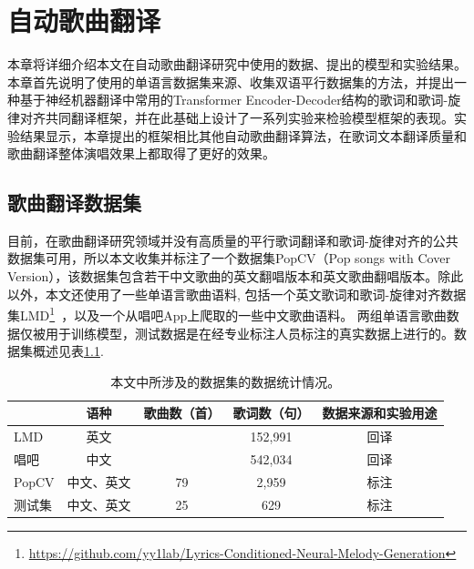 \newcommand{\modelname}{LTAG}
\chapter{自动歌曲翻译}
本章将详细介绍本文在自动歌曲翻译研究中使用的数据、提出的模型和实验结果。本章首先说明了使用的单语言数据集来源、收集双语平行数据集的方法，并提出一种基于神经机器翻译中常用的Transformer Encoder-Decoder结构的歌词和歌词-旋律对齐共同翻译框架，并在此基础上设计了一系列实验来检验模型框架的表现。实验结果显示，本章提出的框架相比其他自动歌曲翻译算法，在歌词文本翻译质量和歌曲翻译整体演唱效果上都取得了更好的效果。
\section{歌曲翻译数据集}
目前，在歌曲翻译研究领域并没有高质量的平行歌词翻译和歌词-旋律对齐的公共数据集可用，所以本文收集并标注了一个数据集PopCV（Pop songs with Cover Version），该数据集包含若干中文歌曲的英文翻唱版本和英文歌曲翻唱版本。除此以外，本文还使用了一些单语言歌曲语料, 包括一个英文歌词和歌词-旋律对齐数据集LMD\footnote{\url{https://github.com/yy1lab/Lyrics-Conditioned-Neural-Melody-Generation}}~\citep{LMD}，以及一个从唱吧App上爬取的一些中文歌曲语料。
两组单语言歌曲数据仅被用于训练模型，测试数据是在经专业标注人员标注的真实数据上进行的。数据集概述见表\ref{tab:dataset_stat}.
\begin{table}[htbp]
    \centering
    \begin{tabular}{|l|c|c|c|c|}
    \hline
         & 语种 & 歌曲数（首） & 歌词数（句） & 数据来源和实验用途\\
    \hline
     LMD & 英文 & \diagbox[]{}{} & 152,991 & 回译\\
    \hline
     唱吧 & 中文 & \diagbox[]{}{} & 542,034 & 回译\\
    \hline
     PopCV & 中文、英文 & 79 & 2,959 & 标注\\
    \hline
     测试集 & 中文、英文 & 25 & 629 & 标注\\
    \hline
    \end{tabular}
    \caption{本文中所涉及的数据集的数据统计情况。}
    \label{tab:dataset_stat}
\end{table}

